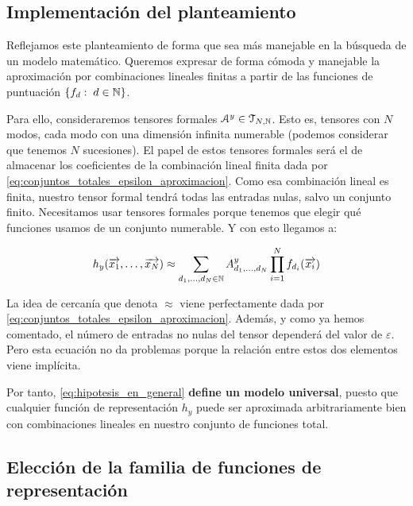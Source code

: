 \subsection{Implementación del planteamiento}

Reflejamos este planteamiento de forma que sea más manejable en la búsqueda de un modelo matemático. Queremos expresar de forma cómoda y manejable la aproximación por combinaciones lineales finitas a partir de las funciones de puntuación $\{ f_d: \; d \in \mathbb{N} \}$.

Para ello, consideraremos tensores formales $\mathcal{A}^y \in \mathcal{T}_{N, \mathbb{N}}$. Esto es, tensores con $N$ modos, cada modo con una dimensión infinita numerable (podemos considerar que tenemos $N$ sucesiones). El papel de estos tensores formales será el de almacenar los coeficientes de la combinación lineal finita dada por \eqref{eq:conjuntos_totales_epsilon_aproximacion}. Como esa combinación lineal es finita, nuestro tensor formal tendrá todas las entradas nulas, salvo un conjunto finito. Necesitamos usar tensores formales porque tenemos que elegir qué funciones usamos de un conjunto numerable. Y con esto llegamos a:

\begin{equation} \label{eq:hipotesis_en_general}
	h_y(\overrightarrow{x_1}, \ldots, \overrightarrow{x_N}) \approx \sum_{d_1, \ldots, d_N \in \mathbb{N}} A^y_{d_1, \ldots, d_N} \prod_{i = 1}^N f_{d_i}(\overrightarrow{x_i})
\end{equation}

\begin{observacion}

	La idea de cercanía que denota $\approx$ viene perfectamente dada por \eqref{eq:conjuntos_totales_epsilon_aproximacion}. Además, y como ya hemos comentado, el número de entradas no nulas del tensor dependerá del valor de $\varepsilon$. Pero esta ecuación no da problemas porque la relación entre estos dos elementos viene implícita.

\end{observacion}

Por tanto, \eqref{eq:hipotesis_en_general} \textbf{define un modelo universal}, puesto que cualquier función de representación $h_y$ puede ser aproximada arbitrariamente bien con combinaciones lineales en nuestro conjunto de funciones total.

\subsection{Elección de la familia de funciones de representación}

